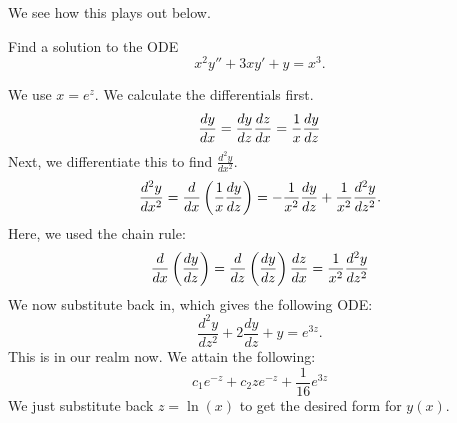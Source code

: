 We see how this plays out below.

\begin{exercise}
Find a solution to the ODE
\[
x^2y''+ 3xy'+ y= x^3.
\]
\end{exercise}
\begin{solution}
We use $x = e^z$. We calculate the differentials first.
\[
\frac{d y}{d x} = \frac{d y}{d z} \frac{d z}{d x}
= \frac{1}{x} \frac{d y}{d z}
\]
Next, we differentiate this to find $\frac{d^2y}{dx^2}$.
\[
\frac{d^2y}{dx^2} = \frac{d }{d x} \left(\frac{1}{x} \frac{d y}{d z}\right) 
= -\frac{1}{x^2} \frac{d y}{d z} + \frac{1}{x^2} \frac{d^2y}{dz^2}.
\]
Here, we used the chain rule:
\[
\frac{d }{d x} \left(\frac{d y}{d z}\right) = \frac{d }{d z} \left(\frac{d y}{d z}\right)\frac{d z}{d x}
= \frac{1}{x^2} \frac{d^2y}{dz^2}
\]
We now substitute back in, which gives the following ODE:
\[
\frac{d^2y}{dz^2} + 2 \frac{dy}{dz} + y = e^{3z}.
\]
This is in our realm now. We attain the following:
\[
c_1 e^{-z} + c_2 z e^{-z} + \frac{1}{16} e^{3z}
\]
We just substitute back $z = \ln (x)$ to get the desired 
form for $y(x)$.
\end{solution}